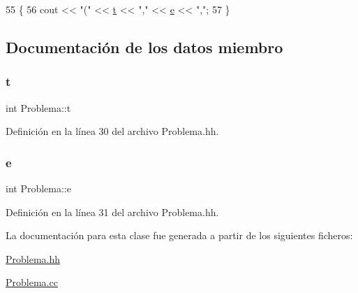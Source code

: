 \begin{DoxyCode}
55                                              \{
56         cout << \textcolor{stringliteral}{"("} << \mbox{\hyperlink{class_problema_a968bd889d6dc627efb59318ccc2eed7d}{t}} << \textcolor{stringliteral}{","} << \mbox{\hyperlink{class_problema_a725a4c8c4faf4d1a646ef7ce9db37211}{e}} << \textcolor{stringliteral}{","};
57       \}
\end{DoxyCode}


\subsection{Documentación de los datos miembro}
\mbox{\label{class_problema_a968bd889d6dc627efb59318ccc2eed7d}} 
\subsubsection{\texorpdfstring{t}{t}}
{\footnotesize\ttfamily int Problema\+::t\hspace{0.3cm}{\ttfamily [private]}}



Definición en la línea 30 del archivo Problema.\+hh.

\mbox{\label{class_problema_a725a4c8c4faf4d1a646ef7ce9db37211}} 
\subsubsection{\texorpdfstring{e}{e}}
{\footnotesize\ttfamily int Problema\+::e\hspace{0.3cm}{\ttfamily [private]}}



Definición en la línea 31 del archivo Problema.\+hh.



La documentación para esta clase fue generada a partir de los siguientes ficheros\+:\begin{DoxyCompactItemize}
\item 
\mbox{\hyperlink{_problema_8hh}{Problema.\+hh}}\item 
\mbox{\hyperlink{_problema_8cc}{Problema.\+cc}}\end{DoxyCompactItemize}
